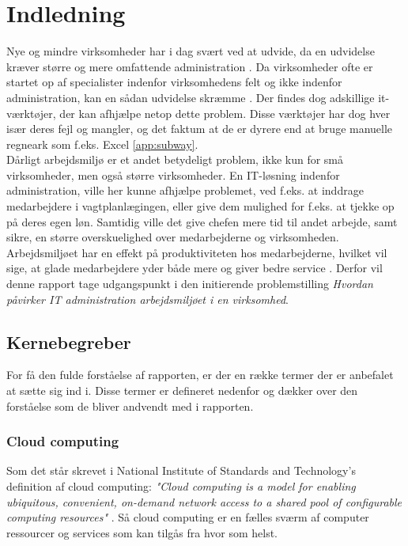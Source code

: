\chapter{Indledning}
Nye og mindre virksomheder har i dag svært ved at udvide, da en udvidelse kræver større og mere omfattende administration \citep{SmaaFirmaerOrker}. Da virksomheder ofte er startet op af specialister indenfor virksomhedens felt og ikke indenfor administration, kan en sådan udvidelse skræmme \citep{SmaaFirmaerOrker}. Der findes dog adskillige it-værktøjer, der kan afhjælpe netop dette problem. Disse værktøjer har dog hver især deres fejl og mangler, og det faktum at de er dyrere end at bruge manuelle regneark som f.eks. Excel \citep{Play}\ref{app:subway}.\\
Dårligt arbejdsmiljø er et andet betydeligt problem, ikke kun for små virksomheder, men også større virksomheder. En IT-løsning indenfor administration, ville her kunne afhjælpe problemet, ved f.eks. at inddrage medarbejdere i vagtplanlægingen, eller give dem mulighed for f.eks. at tjekke op på deres egen løn. Samtidig ville det give chefen mere tid til andet arbejde, samt sikre, en større overskuelighed over medarbejderne og virksomheden. 
Arbejdsmiljøet har en effekt på produktiviteten hos medarbejderne, hvilket vil sige, at glade medarbejdere yder både mere og giver bedre service \citep{Jensen2014}. Derfor vil denne rapport tage udgangspunkt i den initierende problemstilling \textit{Hvordan påvirker IT administration arbejdsmiljøet i en virksomhed}. 

\section{Kernebegreber}
For få den fulde forståelse af rapporten, er der en række termer der er anbefalet at sætte sig ind i. Disse termer er defineret nedenfor og dækker over den forståelse som de bliver andvendt med i rapporten. 
\subsection{Cloud computing}
Som det står skrevet i  National Institute
of Standards and Technology’s definition af cloud computing: \textit{"Cloud computing is a model for enabling ubiquitous, convenient, on-demand network access to a shared pool of configurable computing resources"} \citep{cloud_def}. Så cloud computing er en fælles sværm af computer ressourcer og services som kan tilgås fra hvor som helst.

